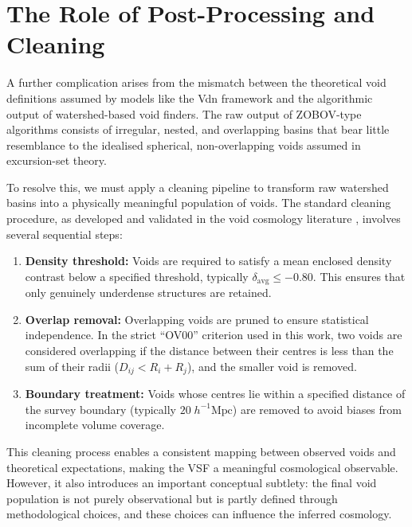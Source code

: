 \documentclass[12pt]{report}
\begin{document}
\section{The Role of Post-Processing and Cleaning}

A further complication arises from the mismatch between the theoretical void definitions assumed by models like the Vdn framework and the algorithmic output of watershed-based void finders. The raw output of ZOBOV-type algorithms consists of irregular, nested, and overlapping basins that bear little resemblance to the idealised spherical, non-overlapping voids assumed in excursion-set theory.

To resolve this, we must apply a cleaning pipeline to transform raw watershed basins into a physically meaningful population of voids. The standard cleaning procedure, as developed and validated in the void cosmology literature \citep{Ronconi2017,Contarini2019,Contarini2023,Sartori2025}, involves several sequential steps:

\begin{enumerate}
    \item \textbf{Density threshold:} Voids are required to satisfy a mean enclosed density contrast below a specified threshold, typically $\delta_\mathrm{avg} \leq -0.80$. This ensures that only genuinely underdense structures are retained.

    \item \textbf{Overlap removal:} Overlapping voids are pruned to ensure statistical independence. In the strict ``OV00'' criterion used in this work, two voids are considered overlapping if the distance between their centres is less than the sum of their radii ($D_{ij} < R_i + R_j$), and the smaller void is removed.

    \item \textbf{Boundary treatment:} Voids whose centres lie within a specified distance of the survey boundary (typically $20\;h^{-1}\mathrm{Mpc}$) are removed to avoid biases from incomplete volume coverage.
\end{enumerate}

This cleaning process enables a consistent mapping between observed voids and theoretical expectations, making the VSF a meaningful cosmological observable. However, it also introduces an important conceptual subtlety: the final void population is not purely observational but is partly defined through methodological choices, and these choices can influence the inferred cosmology.
\end{document}
